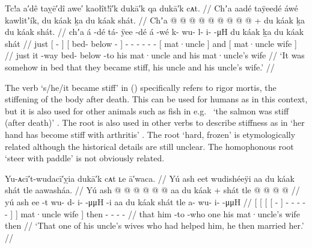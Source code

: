\ex\label{ex:90-90-rigor-mortis}%
%
\begingl
	\glpreamble	Tc!a a′dê taỵē′dî awe′ kaołît!î′k dukā′k qa dukā′k cᴀt. //
	\glpreamble	Chʼa aadé taÿeedé áwé kawlitʼík, du káak ḵa du káak shát. //
	\gla	Chʼa {}  @ {} {}
		{}  @ {} @ {} {}
		 @ {}
		 @ {} @ {} @ {} @ {} @ {} +
		{} du káak {} 
		ḵa
		{} du káak shát. {} //
	\glb	chʼa {} á -dé {}
		{} tá- ÿee -dé {}
		á -wé
		k- wu- l- i-  -μH
		{} du káak {}
		ḵa
		{} du káak shát {} //
	\glc	just {}[  - {}]
		{}[ bed- below - {}]
		 -
		- - - -  -
		{}[  mat·uncle {}]
		and
		{}[  mat·uncle wife {}] //
	\gld	just {} it -way {}
		{} bed- below -to {}
		 {}
		 {} {} {} {} {}
		{} his mat·uncle {}
		and
		{} his mat·uncle’s wife {} //
	\glft	‘It was somehow in bed that they became stiff, his uncle and his uncle’s wife.’
		//
\endgl
\xe

The verb  ‘s/he/it became stiff’ in (\lastx) specifically refers to rigor mortis, the stiffening of the body after death.
This can be used for humans as in this context, but it is also used for other animals such as fish in e.g.\  ‘the salmon was stiff (after death)’ \parencite[212.2981]{story-naish:1973}.
The root  is also used in other verbs to describe stiffness as in  ‘her hand has become stiff with arthritis’ \parencite[212.2980]{story-naish:1973}.
The root  ‘hard, frozen’ is etymologically related although the historical details are still unclear.
The homophonous root  ‘steer with paddle’ is not obviously related.

\ex\label{ex:90-91-marry-uncles-wife}%
%
\begingl
	\glpreamble	Yu-ᴀcī′t-wudacī′ỵia dukā′k cᴀt ʟe ā′waca. //
	\glpreamble	Yú ash eet wudishéeÿi aa du káak shát tle aawasháa. //
	\gla	{} Yú {} {} {} ash  @ {} {}
				 @ {} @ {} @ {} @ {} @ {} {} aa {}
			du káak + shát {}
		tle
		 @ {} @ {} @ {} @ {} //
	\glb	{} yú {} {} {} ash ee -t {}
				wu- d- i-  -μμH -i {} aa {}
			du káak shát {}
		tle
		a- wu- i-  -μμH //
	\glc	{}[  {}[ {}[ {}[   - {}]
				- - -  - - {}]  {}]
			 mat·uncle wife {}]
		then
		- - -  - //
	\gld	{} that {} {} {} him {} -to {}
				 {} {} {} {} -who {} one {}
			his mat·uncle’s wife {}
		then
		 {} {} {} {} //
	\glft	‘That one of his uncle’s wives who had helped him, he then married her.’
		//
\endgl
\xe

